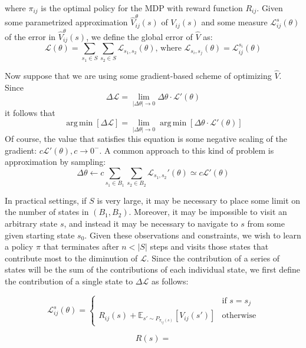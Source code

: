 \documentclass{article}
\DeclareMathOperator*{\argmin}{arg\,min}
\begin{document}
where $\pi_{ij}$ is the optimal policy for the MDP with reward function $R_{ij}$. Given some parametrized approximation $\hat{V}_{ij}^{\theta}(s)$ of $V_{ij}(s)$ and some measure $\mathcal{L}_{ij}^s(\theta)$ of the error in $\hat{V}_{ij}^{\theta}(s)$, we define the global error of $\hat{V}$ as:
\[
   \mathcal{L}(\theta) = \sum_{s_1 \in S}\sum_{s_2 \in S}\mathcal{L}_{s_1,s_2}(\theta)
\text{, where }
   \mathcal{L}_{s_i, s_j}(\theta) = \mathcal{L}_{ij}^{s_i}(\theta)
\]


Now suppose that we are using some gradient-based scheme of optimizing $\hat{V}$. Since 
\[
  \Delta \mathcal{L} = \lim_{|\Delta \theta| \to 0}\Delta \theta \cdot \mathcal{L}'(\theta)
\]
it follows that
\[
  \argmin \left[ \Delta \mathcal{L} \right] = \lim_{|\Delta \theta| \to 0}\argmin \left[ \Delta \theta \cdot \mathcal{L}'(\theta) \right]
\]
Of course, the value that satisfies this equation is some negative scaling of the gradient: $c\mathcal{L}'(\theta), c \to 0^-$. A common approach to this kind of problem is approximation by sampling:
\[
  \Delta \theta \leftarrow c\sum_{s_1 \in B_1}\sum_{s_2 \in B_2}\mathcal{L}_{s_1,s_2}'(\theta) \simeq c\mathcal{L}'(\theta)
\]

In practical settings, if $S$ is very large, it may be necessary to place some limit on the number of states in $(B_1, B_2)$. Moreover, it may be impossible to visit an arbitrary state $s$, and instead it may be necessary to navigate to $s$ from some given starting state $s_0$. Given these observations and constraints, we wish to learn a policy $\pi$ that terminates after $n < |S|$ steps and visits those states that contribute most to the diminution of $\mathcal{L}$. Since the contribution of a series of states will be the sum of the contributions of each individual state, we first define the contribution of a single state to $\Delta \mathcal{L}$ as follows:

\[
	\mathcal{L}_{ij}^s(\theta) = 
  \begin{cases}
     & \text{if } s = s_j \\ 
    R_{ij}(s) + \mathbb{E}_{s' \sim P_{\pi_{ij}(s)}}\left [ V_{ij}(s') \right ] & \text{otherwise}
  \end{cases}
\]

\[
	R(s) = 
\]
\end{document}

